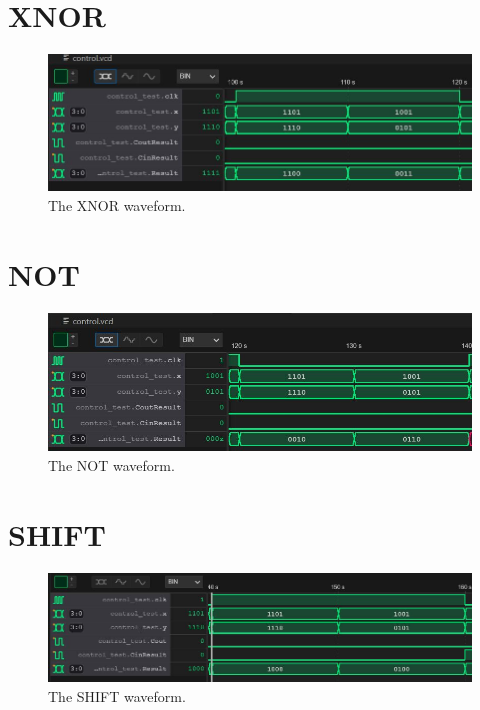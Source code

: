 \documentclass[
	letterpaper, %
	10pt, %
]{CSUniSchoolLabReport}
\begin{document}
\section{XNOR}
\begin{figure}[H] %
    \includegraphics[width=\textwidth]{figures/xnor.JPG} %
    \caption{The XNOR waveform.}
\end{figure}
\section{NOT}
\begin{figure}[H] %
    \includegraphics[width=\textwidth]{figures/not.JPG} %
    \caption{The NOT waveform.}
\end{figure}
\section{SHIFT}
\begin{figure}[H] %
    \includegraphics[width=\textwidth]{figures/shift.JPG} %
    \caption{The SHIFT waveform.}
\end{figure}
\end{document}
